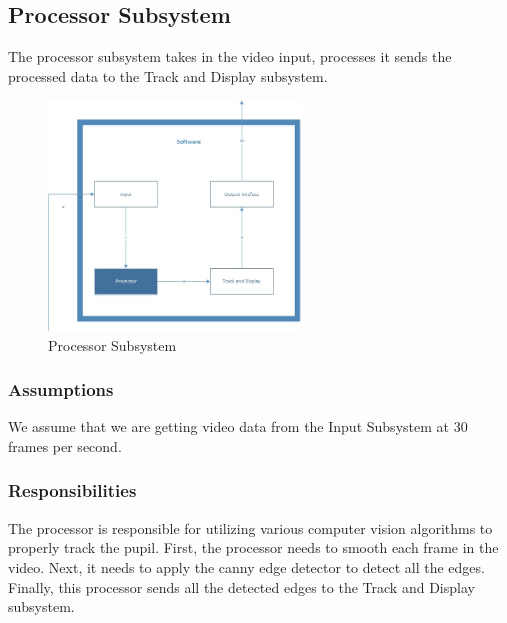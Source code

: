 \subsection{Processor Subsystem}
The processor subsystem takes in the video input, processes it sends the processed data to the Track and Display subsystem.

\begin{figure}[h!]
	\centering
 	\includegraphics[width=0.60\textwidth]{images/Software_Processor.jpg}
 \caption{Processor Subsystem}
\end{figure}



\subsubsection{Assumptions}
We assume that we are getting video data from the Input Subsystem at 30 frames per second. 

\subsubsection{Responsibilities}
The processor is responsible for utilizing various computer vision algorithms to properly track the pupil. First, the processor needs to smooth each frame in the video. Next, it needs to apply the canny edge detector
to detect all the edges. Finally, this processor sends all the detected edges to the Track and Display subsystem. 

